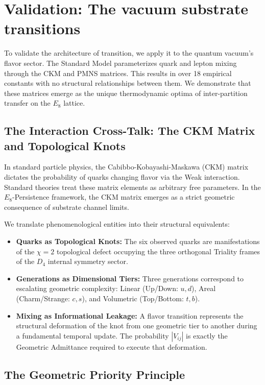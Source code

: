 \section{Validation: The vacuum substrate transitions}
\label{sec:validation_flavor}

To validate the architecture of transition, we apply it to the quantum vacuum's flavor sector. The Standard Model parameterizes quark and lepton mixing through the CKM and PMNS matrices.  This results in over 18 empirical constants with no structural relationships between them. We demonstrate that these matrices emerge as the unique thermodynamic optima of inter-partition transfer on the $E_8$ lattice.

\subsection{The Interaction Cross-Talk: The CKM Matrix and Topological Knots}

In standard particle physics, the Cabibbo-Kobayashi-Maskawa (CKM) matrix dictates the probability of quarks changing flavor via the Weak interaction. Standard theories treat these matrix elements as arbitrary free parameters. In the $E_8$-Persistence framework, the CKM matrix emerges as a strict geometric consequence of substrate channel limits.

We translate phenomenological entities into their structural equivalents:
\begin{itemize}
    \item \textbf{Quarks as Topological Knots:} The six observed quarks are manifestations of the $\chi=2$ topological defect occupying the three orthogonal Triality frames of the $D_4$ internal symmetry sector.
    \item \textbf{Generations as Dimensional Tiers:} Three generations correspond to escalating geometric complexity: Linear (Up/Down: $u,d$), Areal (Charm/Strange: $c,s$), and Volumetric (Top/Bottom: $t,b$).
    \item \textbf{Mixing as Informational Leakage:} A flavor transition represents the structural deformation of the knot from one geometric tier to another during a fundamental temporal update. The probability $|V_{ij}|$ is exactly the Geometric Admittance required to execute that deformation.
\end{itemize}

\subsection{The Geometric Priority Principle}


